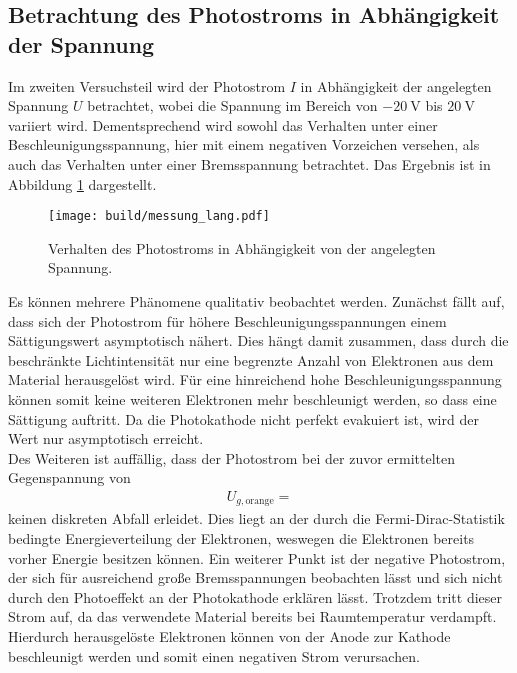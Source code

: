 \subsection{Betrachtung des Photostroms in Abhängigkeit der Spannung}
Im zweiten Versuchsteil wird der Photostrom $I$ in Abhängigkeit der angelegten Spannung $U$ betrachtet, wobei die Spannung im Bereich von $\SI{-20}{\volt}$ bis $\SI{20}{\volt}$ variiert wird.
Dementsprechend wird sowohl das Verhalten unter einer Beschleunigungsspannung, hier mit einem negativen Vorzeichen versehen, als auch das Verhalten unter einer Bremsspannung betrachtet.
Das Ergebnis ist in Abbildung \ref{plot:7} dargestellt.
\begin{figure}
  \centering
  \texttt{[image: build/messung\_lang.pdf]}
  \caption{Verhalten des Photostroms in Abhängigkeit von der angelegten Spannung.}
  \label{plot:7}
\end{figure}
Es können mehrere Phänomene qualitativ beobachtet werden.
Zunächst fällt auf, dass sich der Photostrom für höhere Beschleunigungsspannungen einem Sättigungswert asymptotisch nähert.
Dies hängt damit zusammen, dass durch die beschränkte Lichtintensität nur eine begrenzte Anzahl von Elektronen aus dem Material herausgelöst wird.
Für eine hinreichend hohe Beschleunigungsspannung können somit keine weiteren Elektronen mehr beschleunigt werden, so dass eine Sättigung auftritt. %
Da die Photokathode nicht perfekt evakuiert ist, wird der Wert nur asymptotisch erreicht.\\
Des Weiteren ist auffällig, dass der Photostrom bei der zuvor ermittelten Gegenspannung von
\begin{align*}
  U_{g, \text{orange}} = 
\end{align*}
keinen diskreten Abfall erleidet.
Dies liegt an der durch die Fermi-Dirac-Statistik bedingte Energieverteilung der Elektronen, weswegen die Elektronen bereits vorher Energie besitzen können.
Ein weiterer Punkt ist der negative Photostrom, der sich für ausreichend große Bremsspannungen beobachten lässt und sich nicht durch den Photoeffekt an der Photokathode erklären lässt.
Trotzdem tritt dieser Strom auf, da das verwendete Material bereits bei Raumtemperatur verdampft.
Hierdurch herausgelöste Elektronen können von der Anode zur Kathode beschleunigt werden und somit einen negativen Strom verursachen.
